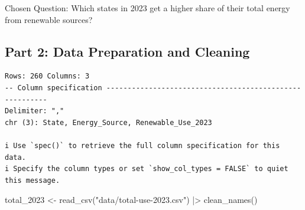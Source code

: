 \documentclass[
  letterpaper,
  DIV=11,
  numbers=noendperiod]{scrartcl}
\newenvironment{Shaded}{\begin{snugshade}}{\end{snugshade}}
\newcommand{\ControlFlowTok}[1]{\textcolor[rgb]{0.00,0.23,0.31}{\textbf{#1}}}
\newcommand{\DocumentationTok}[1]{\textcolor[rgb]{0.37,0.37,0.37}{\textit{#1}}}
\newcommand{\FunctionTok}[1]{\textcolor[rgb]{0.28,0.35,0.67}{#1}}
\newcommand{\NormalTok}[1]{\textcolor[rgb]{0.00,0.23,0.31}{#1}}
\newcommand{\OtherTok}[1]{\textcolor[rgb]{0.00,0.23,0.31}{#1}}
\newcommand{\SpecialCharTok}[1]{\textcolor[rgb]{0.37,0.37,0.37}{#1}}
\newcommand{\StringTok}[1]{\textcolor[rgb]{0.13,0.47,0.30}{#1}}
\begin{document}
Chosen Question: Which states in 2023 get a higher share of their total
energy from renewable sources?

\subsection{\texorpdfstring{\textbf{Part 2: Data Preparation and
Cleaning}}{Part 2: Data Preparation and Cleaning}}\label{part-2-data-preparation-and-cleaning}

\begin{Shaded}
\end{Shaded}

\begin{verbatim}
Rows: 260 Columns: 3
-- Column specification --------------------------------------------------------
Delimiter: ","
chr (3): State, Energy_Source, Renewable_Use_2023

i Use `spec()` to retrieve the full column specification for this data.
i Specify the column types or set `show_col_types = FALSE` to quiet this message.
\end{verbatim}

\begin{Shaded}
\begin{Highlighting}[]
\NormalTok{total\_2023 }\OtherTok{\textless{}{-}} \FunctionTok{read\_csv}\NormalTok{(}\StringTok{"data/total{-}use{-}2023.csv"}\NormalTok{) }\SpecialCharTok{|\textgreater{}} \FunctionTok{clean\_names}\NormalTok{()}
\end{Highlighting}
\end{Shaded}
\end{document}
